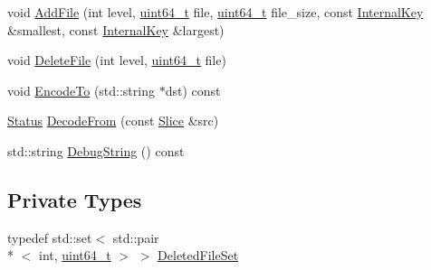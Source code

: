 \begin{DoxyCompactItemize}
\item 
void \hyperlink{classleveldb_1_1_version_edit_a4cd5cc92761b7ae5b5f9cff46cb88263}{Add\-File} (int level, \hyperlink{stdint_8h_aaa5d1cd013383c889537491c3cfd9aad}{uint64\-\_\-t} file, \hyperlink{stdint_8h_aaa5d1cd013383c889537491c3cfd9aad}{uint64\-\_\-t} file\-\_\-size, const \hyperlink{classleveldb_1_1_internal_key}{Internal\-Key} \&smallest, const \hyperlink{classleveldb_1_1_internal_key}{Internal\-Key} \&largest)
\item 
void \hyperlink{classleveldb_1_1_version_edit_ac222bfd1055114d57aadbd124f24ad0c}{Delete\-File} (int level, \hyperlink{stdint_8h_aaa5d1cd013383c889537491c3cfd9aad}{uint64\-\_\-t} file)
\item 
void \hyperlink{classleveldb_1_1_version_edit_aa3161c67223f6c5e843be579a8456086}{Encode\-To} (std\-::string $\ast$dst) const 
\item 
\hyperlink{classleveldb_1_1_status}{Status} \hyperlink{classleveldb_1_1_version_edit_ac0f431c5e8f08c74c697d8480f7c005f}{Decode\-From} (const \hyperlink{classleveldb_1_1_slice}{Slice} \&src)
\item 
std\-::string \hyperlink{classleveldb_1_1_version_edit_aa186529f0124867251964b2346b58b1f}{Debug\-String} () const 
\end{DoxyCompactItemize}
\subsection*{Private Types}
\begin{DoxyCompactItemize}
\item 
typedef std\-::set$<$ std\-::pair\\*
$<$ int, \hyperlink{stdint_8h_aaa5d1cd013383c889537491c3cfd9aad}{uint64\-\_\-t} $>$ $>$ \hyperlink{classleveldb_1_1_version_edit_af4a08c41c6232dbca0dd31c2e3fa7a9b}{Deleted\-File\-Set}
\end{DoxyCompactItemize}
